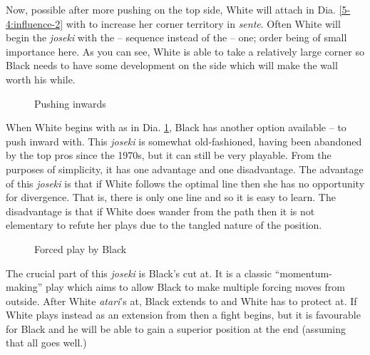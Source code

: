 \documentclass[a5paper,12pt,twoside]{book} %
\newcounter{joseki}                 %
\newcommand{\drefs}[1]{Dia. \ref{#1}}
\newcommand{\addstufftotoc}[2][toc]{%
  \addtocontents{#1}{#2}}
\begin{document}
\addstufftotoc{\nobreak\smallskip\protect\par}

Now, possible after more pushing on the top side, White will attach in \drefs{5-4:influence-2} with{\large\whitestone[7]} to increase her corner territory in \textit{sente}. Often White will begin the \textit{joseki} with the{\large\whitestone[7]} –{\large\blackstone[10]} sequence instead of the{\large\whitestone[3]} –{\large\blackstone[6]} one; order being of small importance here. As you can see, White is able to take a relatively large corner so Black needs to have some development on the side which will make the wall worth his while.\\

\begin{figure}[!htbp]
 
\vspace{-0.6cm}\caption{Pushing inwards}
\label{5-4:influence-3}
\end{figure}

When White begins with{\large\whitestone[3]} as in \drefs{5-4:influence-3}, Black has another option available – to push inward with{\large\blackstone[4]}. This \textit{joseki} is somewhat old-fashioned, having been abandoned by the top pros since the 1970s, but it can still be very playable. From the purposes of simplicity, it has one advantage and one disadvantage. The advantage of this \textit{joseki} is that if White follows the optimal line then she has no opportunity for divergence. That is, there is only one line and so it is easy to learn. The disadvantage is that if White does wander from the path then it is not elementary to refute her plays due to the tangled nature of the position.\\

\begin{figure}[!htbp]
 
\vspace{-0.6cm}\caption{Forced play by Black}
\label{5-4:influence-4}
\end{figure}

The crucial part of this \textit{joseki} is Black’s cut at{\large\blackstone[6]}. It is a classic “momentum-making” play which aims to allow Black to make multiple forcing moves from outside. After White \textit{atari}’s at{\large\whitestone[7]}, Black extends to{\large\blackstone[8]} and White has to protect at{\large\whitestone[9]}. If White plays{\large\whitestone[7]} instead as an extension from{\large\whitestone[1]} then a fight begins, but it is favourable for Black and he will be able to gain a superior position at the end (assuming that all goes well.)\\
\end{document}
